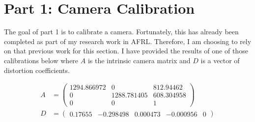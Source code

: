\section*{Part 1: Camera Calibration}

The goal of part 1 is to calibrate a camera.
Fortunately, this has already been completed as part of my research work in AFRL.
Therefore, I am choosing to rely on that previous work for this section.
I have provided the results of one of those calibrations below where $A$ is the intrinsic camera matrix and $D$ is a vector of distortion coefficients.

\begin{align*}
  A & =
  \begin{pmatrix}
    1294.866972 & 0           & 812.94462  \\
    0           & 1288.781405 & 608.304958 \\
    0           & 0           & 1
  \end{pmatrix} \\
  D & =
  \begin{pmatrix}
    0.17655 & -0.298498 & 0.000473 & -0.000956 & 0
  \end{pmatrix}
\end{align*}
